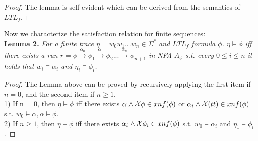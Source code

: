 \begin{proof}
The lemma is self-evident which can be derived from the semantics of $LTL_f$.
\end{proof}

Now we characterize the satisfaction relation for finite sequences: \\
{\bf Lemma 2.}  {\it For a finite trace $\eta = w_0w_1...w_n \in \Sigma^{*}$ and $LTL_f$ formula $\phi$. $\eta \models \phi$ iff there exists a run $r = \phi \overset{\alpha_0}{\rightarrow}\phi_1\overset{\alpha_1}{\rightarrow}\phi_2...\overset{\alpha_n}{\rightarrow}\phi_{n+1}$ in NFA $A_{\phi}$ s.t. every $0 \leq i \leq n$ it holds that $w_i \models \alpha_i$ and $\eta_i \models \phi_i $.}
\begin{proof}
The Lemma above can be proved by recursively applying the first item if $n = 0$, and the second item if $n \geq 1$. \\
1) If n = 0, then $\eta \models \phi$ iff there exists $ \alpha \wedge \mathcal{X}\phi \in xnf(\phi)$ or $\alpha_i \wedge \mathcal{X}(tt) \in xnf(\phi)$ s.t. $w_0 \models \alpha, \alpha \models \phi$.\\
2) If $n \geq 1$, then  $\eta \models \phi$ iff there exists  $ \alpha_i \wedge \mathcal{X}\phi_i \in xnf(\phi)$ s.t. $w_0 \models \alpha_i$ and $\eta_1 \models \phi_i $.


\end{proof}
